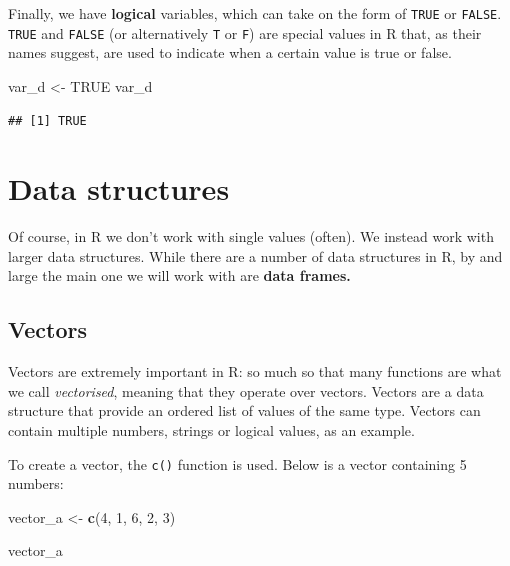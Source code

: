 \documentclass[
]{book}
\newenvironment{Shaded}{\begin{snugshade}}{\end{snugshade}}
\newcommand{\ConstantTok}[1]{\textcolor[rgb]{0.56,0.35,0.01}{#1}}
\newcommand{\DecValTok}[1]{\textcolor[rgb]{0.00,0.00,0.81}{#1}}
\newcommand{\FunctionTok}[1]{\textcolor[rgb]{0.13,0.29,0.53}{\textbf{#1}}}
\newcommand{\NormalTok}[1]{#1}
\newcommand{\OtherTok}[1]{\textcolor[rgb]{0.56,0.35,0.01}{#1}}
\begin{document}
Finally, we have \textbf{logical} variables, which can take on the form of \texttt{TRUE} or \texttt{FALSE}. \texttt{TRUE} and \texttt{FALSE} (or alternatively \texttt{T} or \texttt{F}) are special values in R that, as their names suggest, are used to indicate when a certain value is true or false.

\begin{Shaded}
\begin{Highlighting}[]
\NormalTok{var\_d }\OtherTok{\textless{}{-}} \ConstantTok{TRUE}
\NormalTok{var\_d}
\end{Highlighting}
\end{Shaded}

\begin{verbatim}
## [1] TRUE
\end{verbatim}

\section{Data structures}\label{data-structures}

Of course, in R we don't work with single values (often). We instead work with larger data structures. While there are a number of data structures in R, by and large the main one we will work with are \textbf{data frames.}

\subsection{Vectors}\label{vectors}

Vectors are extremely important in R: so much so that many functions are what we call \emph{vectorised}, meaning that they operate over vectors. Vectors are a data structure that provide an ordered list of values of the same type. Vectors can contain multiple numbers, strings or logical values, as an example.

To create a vector, the \texttt{c()} function is used. Below is a vector containing 5 numbers:

\begin{Shaded}
\begin{Highlighting}[]
\NormalTok{vector\_a }\OtherTok{\textless{}{-}} \FunctionTok{c}\NormalTok{(}\DecValTok{4}\NormalTok{, }\DecValTok{1}\NormalTok{, }\DecValTok{6}\NormalTok{, }\DecValTok{2}\NormalTok{, }\DecValTok{3}\NormalTok{)}

\NormalTok{vector\_a}
\end{Highlighting}
\end{Shaded}
\end{document}
